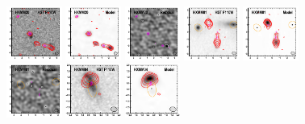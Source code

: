 \documentclass[iop]{emulateapj}
\begin{document}
\begin{figure}[!tbp]
\begin{centering}
\includegraphics[width=0.162\textwidth]{../Figures/modelfit/HXMM20_optical_bestfit.pdf}
\includegraphics[width=0.162\textwidth]{../Figures/modelfit/HXMM20_model_bestfit.pdf}
\includegraphics[width=0.162\textwidth]{../Figures/modelfit/HXMM20_residual_bestfit.pdf}
\includegraphics[width=0.162\textwidth]{../Figures/modelfit/HXMM01_optical_bestfit.pdf}
\includegraphics[width=0.162\textwidth]{../Figures/modelfit/HXMM01_model_bestfit.pdf}
\includegraphics[width=0.162\textwidth]{../Figures/modelfit/HXMM01_residual_bestfit.pdf}
\includegraphics[width=0.162\textwidth]{../Figures/modelfit/HXMM04_optical_bestfit.pdf}
\includegraphics[width=0.162\textwidth]{../Figures/modelfit/HXMM04_model_bestfit.pdf}

\end{centering}
\end{figure}
\end{document}
